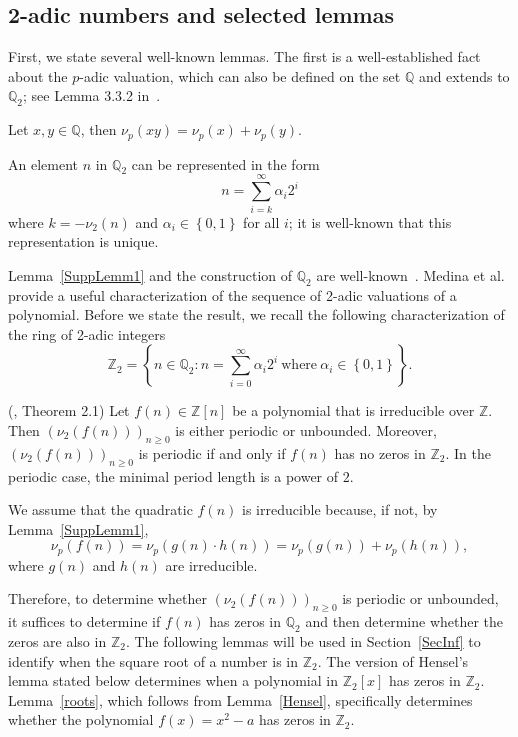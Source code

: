 \documentclass[12pt]{article}
\begin{document}
\subsection{2-adic numbers and selected lemmas}\label{SecLemmas}

First, we state several well-known lemmas. The first is a well-established fact about the $p$-adic valuation, which can also be defined on the set $\mathbb{Q}$ and extends to $\mathbb{Q}_2$; see Lemma 3.3.2 in~\cite{Gouvea}.

\begin{lemma}\label{SuppLemm1}
Let $x,y\in\mathbb{Q}$, then $\nu_{p}(xy)=\nu_{p}(x)+\nu_{p}(y)$.
\end{lemma}

An element $n$ in $\mathbb{Q}_2$ can be represented in the form 
\begin{equation}\label{SuppLemma3.5}
    n=\sum_{i=k}^{\infty}\alpha_{i}2^{i}
\end{equation}
where $k=-\nu_{2}(n)$ and $\alpha_{i}\in\left\{0,1\right\}$ for all $i$; it is well-known that this representation is unique. 

Lemma~\ref{SuppLemm1} and the construction of $\mathbb{Q}_{2}$ are well-known~\cite{Gouvea}. Medina et al.~\cite{Medina} provide a useful characterization of the sequence of 2-adic valuations of a polynomial. Before we state the result, we recall the following characterization of the ring of 2-adic integers
\begin{equation*}
\mathbb{Z}_{2}=\left\{n\in\mathbb{Q}_{2}:n=\sum_{i=0}^{\infty}\alpha_{i}2^{i}\ \text{where}\ \alpha_{i}\in\left\{0,1\right\}\right\}.
\end{equation*}

\begin{lemma}\label{SuppLemm6}
(\cite{Medina}, Theorem 2.1) Let $f(n)\in\mathbb{Z}[n]$ be a polynomial that is irreducible over $\mathbb{Z}$. Then $(\nu_{2}(f(n)))_{n\geq0}$ is either periodic or unbounded. Moreover, $(\nu_{2}(f(n)))_{n\geq0}$ is periodic if and only if $f(n)$ has no zeros in $\mathbb{Z}_{2}$. In the periodic case, the minimal period length is a power of $2$.
\end{lemma}

We assume that the quadratic $f(n)$ is irreducible because, if not, by Lemma~\ref{SuppLemm1}, $$\nu_p(f(n))=\nu_p(g(n)\cdot h(n))=\nu_p(g(n))+\nu_p(h(n)),$$ where $g(n)$ and $h(n)$ are irreducible.

Therefore, to determine whether $(\nu_{2}(f(n)))_{n\geq0}$ is periodic or unbounded, it suffices to determine if $f(n)$ has zeros in $\mathbb{Q}_2$ and then determine whether the zeros are also in $\mathbb{Z}_{2}$.
The following lemmas will be used in Section~\ref{SecInf} to identify when the square root of a number is in $\mathbb{Z}_{2}$. The version of Hensel's lemma stated below determines when a polynomial in $\mathbb{Z}_{2}[x]$ has zeros in $\mathbb{Z}_{2}$. Lemma~\ref{roots}, which follows from Lemma~\ref{Hensel}, specifically determines whether the polynomial $f(x)=x^{2}-a$ has zeros in $\mathbb{Z}_{2}$.
\end{document}
